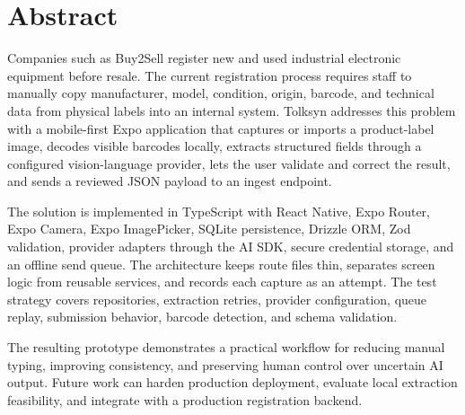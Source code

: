 \chapter*{Abstract}

Companies such as Buy2Sell register new and used industrial electronic equipment before resale. The current registration process requires staff to manually copy manufacturer, model, condition, origin, barcode, and technical data from physical labels into an internal system. Tolksyn addresses this problem with a mobile-first Expo application that captures or imports a product-label image, decodes visible barcodes locally, extracts structured fields through a configured vision-language provider, lets the user validate and correct the result, and sends a reviewed JSON payload to an ingest endpoint.

The solution is implemented in TypeScript with React Native, Expo Router, Expo Camera, Expo ImagePicker, SQLite persistence, Drizzle ORM, Zod validation, provider adapters through the AI SDK, secure credential storage, and an offline send queue. The architecture keeps route files thin, separates screen logic from reusable services, and records each capture as an attempt. The test strategy covers repositories, extraction retries, provider configuration, queue replay, submission behavior, barcode detection, and schema validation.

The resulting prototype demonstrates a practical workflow for reducing manual typing, improving consistency, and preserving human control over uncertain AI output. Future work can harden production deployment, evaluate local extraction feasibility, and integrate with a production registration backend.
